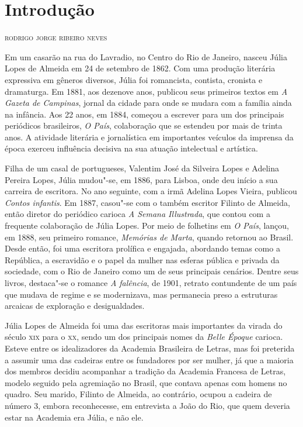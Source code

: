 \chapter[Introdução, \emph{por Rodrigo Jorge Ribeiro Neves}]{Introdução}

\begin{flushright}
\textsc{rodrigo jorge ribeiro neves}
\end{flushright}

Em um casarão na rua do Lavradio, no Centro do Rio de Janeiro, nasceu
Júlia Lopes de Almeida em 24 de setembro de 1862. Com uma produção
literária expressiva em gêneros diversos, Júlia foi romancista,
contista, cronista e dramaturga. Em 1881, aos dezenove anos, publicou
seus primeiros textos em \emph{A Gazeta de Campinas}, jornal da cidade
para onde se mudara com a família ainda na infância. Aos 22 anos, em
1884, começou a escrever para um dos principais periódicos brasileiros,
\emph{O País}, colaboração que se estendeu por mais de trinta anos. A
atividade literária e jornalística em importantes veículos da imprensa
da época exerceu influência decisiva na sua atuação intelectual e
artística.

Filha de um casal de portugueses, Valentim José da Silveira Lopes e
Adelina Pereira Lopes, Júlia mudou"-se, em 1886, para Lisboa, onde deu
início a sua carreira de escritora. No ano seguinte, com a irmã Adelina
Lopes Vieira, publicou \emph{Contos infantis}. Em 1887, casou"-se com o
também escritor Filinto de Almeida, então diretor do periódico carioca
\emph{A Semana Illustrada}, que contou com a frequente colaboração de
Júlia Lopes. Por meio de folhetins em \emph{O País}, lançou, em 1888,
seu primeiro romance, \emph{Memórias de Marta}, quando retornou ao
Brasil. Desde então, foi uma escritora prolífica e engajada, abordando
temas como a República, a escravidão e o papel da mulher nas esferas
pública e privada da sociedade, com o Rio de Janeiro como um de seus
principais cenários. Dentre seus livros, destaca"-se o romance \emph{A
falência}, de 1901, retrato contundente de um país que mudava de regime
e se modernizava, mas permanecia preso a estruturas arcaicas de
exploração e desigualdades.

Júlia Lopes de Almeida foi uma das escritoras mais importantes da virada
do século \textsc{xix} para o \textsc{xx}, sendo um dos principais nomes da \emph{Belle
Époque} carioca. Esteve entre os idealizadores da Academia Brasileira de
Letras, mas foi preterida a assumir uma das cadeiras entre os fundadores
por ser mulher, já que a maioria dos membros decidiu acompanhar a
tradição da Academia Francesa de Letras, modelo seguido pela agremiação
no Brasil, que contava apenas com homens no quadro. Seu marido, Filinto
de Almeida, ao contrário, ocupou a cadeira de número 3, embora
reconhecesse, em entrevista a João do Rio, que quem deveria estar na
Academia era Júlia, e não ele.

